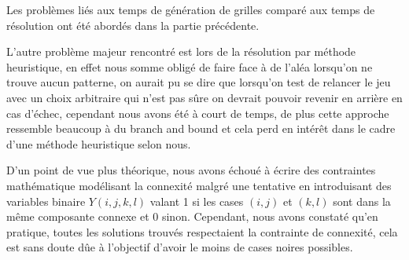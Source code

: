 \documentclass[a4paper,12pt,titlepage,leqno]{article}
\begin{document}
Les problèmes liés aux temps de génération de grilles comparé aux temps de résolution ont été abordés dans la partie précédente. \par L'autre problème majeur rencontré est lors de la résolution par méthode heuristique, en effet nous somme obligé de faire face à de l'aléa lorsqu'on ne trouve aucun patterne, on aurait pu se dire que lorsqu'on test de relancer le jeu avec un choix arbitraire qui n'est pas sûre on devrait pouvoir revenir en arrière en cas d'échec, cependant nous avons été à court de temps, de plus cette approche ressemble beaucoup à du branch and bound et cela perd en intérêt dans le cadre d'une méthode heuristique selon nous.
\par
D'un point de vue plus théorique, nous avons échoué à écrire des contraintes mathématique modélisant la connexité malgré une tentative en introduisant des variables binaire $Y(i,j,k,l)$ valant 1 si les cases $(i,j)$ et $(k,l)$ sont dans la même composante connexe et 0 sinon. Cependant, nous avons constaté qu'en pratique, toutes les solutions trouvés respectaient la contrainte de connexité, cela est sans doute dûe à l'objectif d'avoir le moins de cases noires possibles.

\appendix

\printbibliography[heading=bibintoc]
\end{document}
